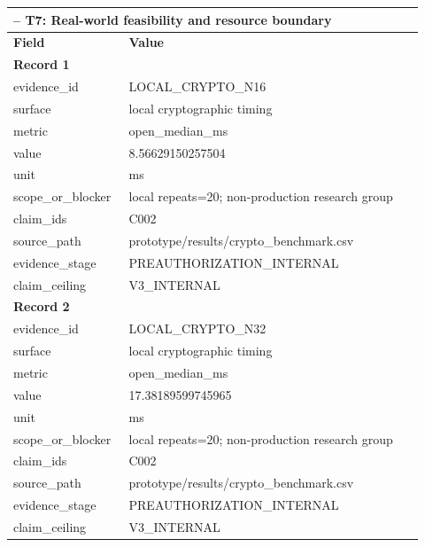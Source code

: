 \begingroup
\setlength{\tabcolsep}{2pt}
\small\sloppy
\begin{longtable}{|p{0.24\linewidth}|p{0.68\linewidth}|}
\hline
\multicolumn{2}{|l|}{\KeystoneDraftTableNotice{} -- T7: Real-world feasibility and resource boundary} \\ \hline
\textbf{Field} & \textbf{Value} \\ \hline
\multicolumn{2}{|l|}{\textbf{Record 1}} \\ \hline
evidence\_\allowbreak{}id & LOCAL\_\allowbreak{}CRYPTO\_\allowbreak{}N16 \\ \hline
surface & local cryptographic timing \\ \hline
metric & open\_\allowbreak{}median\_\allowbreak{}ms \\ \hline
value & 8.56629150257504 \\ \hline
unit & ms \\ \hline
scope\_\allowbreak{}or\_\allowbreak{}blocker & local repeats=20;\allowbreak{} non-production research group \\ \hline
claim\_\allowbreak{}ids & C002 \\ \hline
source\_\allowbreak{}path & prototype/results/crypto\_\allowbreak{}benchmark.csv \\ \hline
evidence\_\allowbreak{}stage & PREAUTHORIZATION\_\allowbreak{}INTERNAL \\ \hline
claim\_\allowbreak{}ceiling & V3\_\allowbreak{}INTERNAL \\ \hline
\multicolumn{2}{|l|}{\textbf{Record 2}} \\ \hline
evidence\_\allowbreak{}id & LOCAL\_\allowbreak{}CRYPTO\_\allowbreak{}N32 \\ \hline
surface & local cryptographic timing \\ \hline
metric & open\_\allowbreak{}median\_\allowbreak{}ms \\ \hline
value & 17.38189599745965 \\ \hline
unit & ms \\ \hline
scope\_\allowbreak{}or\_\allowbreak{}blocker & local repeats=20;\allowbreak{} non-production research group \\ \hline
claim\_\allowbreak{}ids & C002 \\ \hline
source\_\allowbreak{}path & prototype/results/crypto\_\allowbreak{}benchmark.csv \\ \hline
evidence\_\allowbreak{}stage & PREAUTHORIZATION\_\allowbreak{}INTERNAL \\ \hline
claim\_\allowbreak{}ceiling & V3\_\allowbreak{}INTERNAL \\ \hline

\end{longtable}
